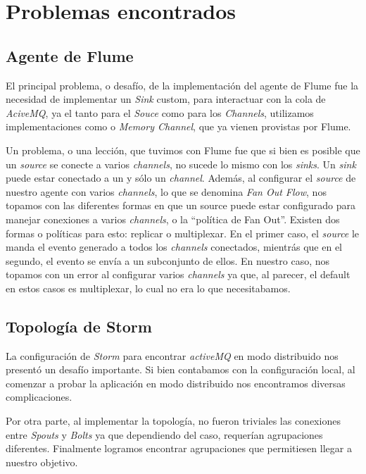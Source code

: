 \documentclass[a4paper,10pt]{article}
\begin{document}
\section{Problemas encontrados}

\subsection{Agente de Flume}
El principal problema, o desafío, de la implementación del agente de Flume fue la necesidad de implementar un \textit{Sink} custom, para interactuar con la cola
de \textit{AciveMQ}, ya el tanto para el \textit{Souce} como para los \textit{Channels}, utilizamos implementaciones como  o \textit{Memory Channel},
que ya vienen provistas por Flume.

Un problema, o una lección, que tuvimos con Flume fue que si bien es posible que un \textit{source} se conecte a varios \textit{channels}, no sucede lo mismo con los \textit{sinks}.
Un \textit{sink} puede estar conectado a un y sólo un \textit{channel}. Además, al configurar el \textit{source} de nuestro agente con varios \textit{channels}, lo que
se denomina \textit{Fan Out Flow}, nos topamos con las
diferentes formas en que un source puede estar configurado para manejar conexiones a varios \textit{channels}, o la ``política de Fan Out''. Existen dos formas o políticas para esto:
replicar o multiplexar. En el primer caso, el \textit{source} le manda el evento generado a todos los \textit{channels} conectados, mientrás que en el segundo, el evento se envía
a un subconjunto de ellos. En nuestro caso, nos topamos con un error al configurar varios \textit{channels} ya que, al parecer, el default en estos casos es multiplexar, lo cual no
era lo que necesitabamos.

\subsection{Topología de Storm}

La configuración de \textit{Storm} para encontrar \textit{activeMQ} en modo distribuido nos presentó un desafío importante. Si bien contabamos con la configuración local,
al comenzar a probar la aplicación en modo distribuido nos encontramos diversas complicaciones.

Por otra parte, al implementar la topología, no fueron triviales las conexiones entre \textit{Spouts} y \textit{Bolts} ya que dependiendo del caso, requerían agrupaciones
diferentes. Finalmente logramos encontrar agrupaciones que permitiesen llegar a nuestro objetivo.
\end{document}

